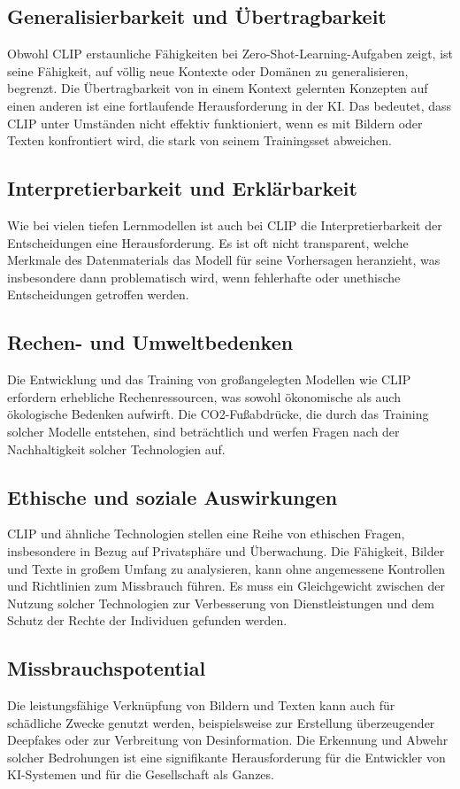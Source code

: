\documentclass[nolibertine, ngerman, algorithm, nomencl, minted]{ttlab-qualify}
\begin{document}
\subsection{Generalisierbarkeit und Übertragbarkeit}
Obwohl CLIP erstaunliche Fähigkeiten bei Zero-Shot-Learning-Aufgaben zeigt, ist seine Fähigkeit, auf völlig neue Kontexte 
oder Domänen zu generalisieren, begrenzt. Die Übertragbarkeit von in einem Kontext gelernten Konzepten auf einen anderen ist 
eine fortlaufende Herausforderung in der KI. Das bedeutet, dass CLIP unter Umständen nicht effektiv funktioniert, wenn es mit 
Bildern oder Texten konfrontiert wird, die stark von seinem Trainingsset abweichen.

\subsection{Interpretierbarkeit und Erklärbarkeit}
Wie bei vielen tiefen Lernmodellen ist auch bei CLIP die Interpretierbarkeit der Entscheidungen eine Herausforderung. 
Es ist oft nicht transparent, welche Merkmale des Datenmaterials das Modell für seine Vorhersagen heranzieht, 
was insbesondere dann problematisch wird, wenn fehlerhafte oder unethische Entscheidungen getroffen werden.

\subsection{Rechen- und Umweltbedenken}
Die Entwicklung und das Training von großangelegten Modellen wie CLIP erfordern erhebliche Rechenressourcen, 
was sowohl ökonomische als auch ökologische Bedenken aufwirft. Die CO2-Fußabdrücke, die durch das Training solcher 
Modelle entstehen, sind beträchtlich und werfen Fragen nach der Nachhaltigkeit solcher Technologien auf.

\subsection{Ethische und soziale Auswirkungen}
CLIP und ähnliche Technologien stellen eine Reihe von ethischen Fragen, insbesondere in Bezug auf Privatsphäre und Überwachung. 
Die Fähigkeit, Bilder und Texte in großem Umfang zu analysieren, kann ohne angemessene Kontrollen und Richtlinien zum Missbrauch 
führen. Es muss ein Gleichgewicht zwischen der Nutzung solcher Technologien zur Verbesserung von Dienstleistungen und dem Schutz 
der Rechte der Individuen gefunden werden.

\subsection{Missbrauchspotential}
Die leistungsfähige Verknüpfung von Bildern und Texten kann auch für schädliche Zwecke genutzt werden, beispielsweise zur 
Erstellung überzeugender Deepfakes oder zur Verbreitung von Desinformation. Die Erkennung und Abwehr solcher Bedrohungen ist 
eine signifikante Herausforderung für die Entwickler von KI-Systemen und für die Gesellschaft als Ganzes.
\end{document}
